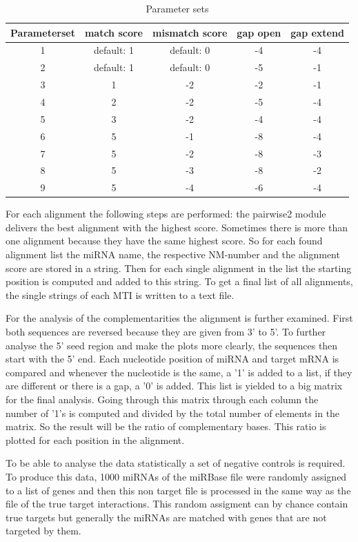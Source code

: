 \documentclass[12pt]{article}
\begin{document}
\begin{table}
\caption{Parameter sets}
\vspace{0.3cm}
\begin{tabular}{c|c|c|c|c}
Parameterset & match score & mismatch score & gap open & gap extend\\
\hline\hline 
1 & default: 1 & default: 0 & -4 & -4\\
2 &  default: 1 & default: 0 & -5 & -1 \\
3 &  1 & -2 & -2 & -1 \\
4 &  2 & -2 & -5 & -4 \\
5 &  3 & -2 & -4 & -4 \\
6 &  5 & -1 & -8 & -4 \\
7 &  5 & -2 & -8 & -3 \\
8 &  5 & -3 & -8 & -2 \\
9 &  5 & -4 & -6 & -4 \\
\hline
\end{tabular}
\label{table:parameter}
\end{table}

For each alignment the following steps are performed: the pairwise2 module delivers the best alignment with the highest score. Sometimes there is more than one alignment because they have the same highest score. So for each found alignment list the miRNA name, the respective NM-number and the alignment score are stored in a string. Then for each single alignment in the list the starting position is computed and added to this string. To get a final list of all alignments, the single strings of each MTI is written to a text file.

For the analysis of the complementarities the alignment is further examined. First both sequences are reversed because they are given from 3' to 5'. To further analyse the 5' seed region and make the plots more clearly, the sequences then start with the 5' end. 
Each nucleotide position of miRNA and target mRNA is compared and whenever the nucleotide is the same, a '1' is added to a list, if they are different or there is a gap, a '0' is added. This list is yielded to a big matrix for the final analysis. Going through this matrix through each column the number of '1's is computed and divided by the total number of elements in the matrix. So the result will be the ratio of complementary bases. This ratio is plotted for each position in the alignment. 

To be able to analyse the data statistically a set of negative controls is required. To produce this data, 1000 miRNAs of the miRBase file were randomly assigned to a list of genes and then this non target file is processed in the same way as the file of the true target interactions. This random assigment can by chance contain true targets but generally the miRNAs are matched with genes that are not targeted by them. \\
\end{document}
